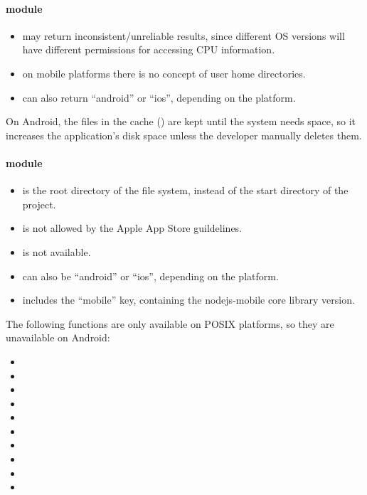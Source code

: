 \paragraph{\protect{} module}

\begin{itemize}
  \setlength\itemsep{-0.5em}
  \item {} may return inconsistent/unreliable results, since different OS versions will have different permissions for accessing CPU information.
  \item {} on mobile platforms there is no concept of user home directories.
  \item {} can also return \enquote{android} or \enquote{ios}, depending on the platform.
\end{itemize}

On Android, the files in the cache () are kept until the system needs space, so it increases the application's disk space unless the developer manually deletes them.

\newpage

\paragraph{\protect{} module}

\begin{itemize}
  \setlength\itemsep{-0.5em}
  \item {} is the root directory of the file system, instead of the start directory of the project.
  \item {} is not allowed by the Apple App Store guildelines.
  \item {} is not available.
  \item {} can also be \enquote{android} or \enquote{ios}, depending on the platform.
  \item {} includes the \enquote{mobile} key, containing the nodejs-mobile core library version.
\end{itemize}

The following functions are only available on POSIX platforms, so they are unavailable on Android:

\begin{itemize}
  \setlength\itemsep{-0.8em}
  \item {}
  \item {}
  \item {}
  \item {}
  \item {}
  \item {}
  \item {}
  \item {}
  \item {}
  \item {}
\end{itemize}

\printfn
